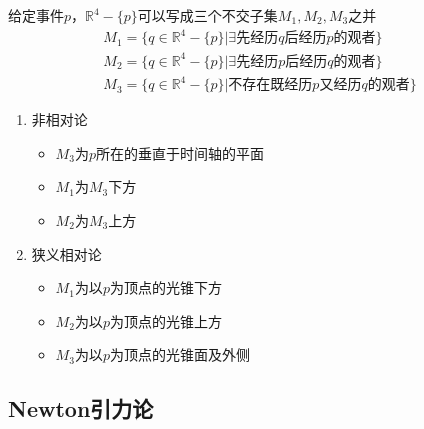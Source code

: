 给定事件$p$，$\mathbb{R}^4-\{p\}$可以写成三个不交子集$M_1,M_2,M_3$之并
\begin{gather*}
    M_1=\{q \in \mathbb{R}^4-\{p\} \vert \exists \text{先经历$q$后经历$p$的观者} \}
    \\
    M_2=\{q \in \mathbb{R}^4-\{p\} \vert \exists \text{先经历$p$后经历$q$的观者} \}
    \\
    M_3=\{q \in \mathbb{R}^4-\{p\} \vert \text{不存在既经历$p$又经历$q$的观者} \}
\end{gather*}
\begin{enumerate}
    \item 非相对论
    \begin{itemize}
        \item $M_3$为$p$所在的垂直于时间轴的平面
        \item $M_1$为$M_3$下方
        \item $M_2$为$M_3$上方
    \end{itemize}
    \item 狭义相对论
    \begin{itemize}
        \item $M_1$为以$p$为顶点的光锥下方
        \item $M_2$为以$p$为顶点的光锥上方
        \item $M_3$为以$p$为顶点的光锥面及外侧
    \end{itemize}
\end{enumerate}

\subsection{Newton引力论}

